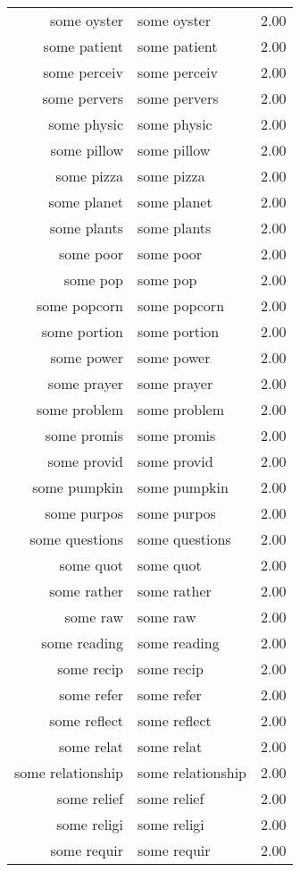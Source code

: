 \begin{table}[ht]
\begin{tabular}{rlr}
  some oyster & some oyster & 2.00 \\ 
  some patient & some patient & 2.00 \\ 
  some perceiv & some perceiv & 2.00 \\ 
  some pervers & some pervers & 2.00 \\ 
  some physic & some physic & 2.00 \\ 
  some pillow & some pillow & 2.00 \\ 
  some pizza & some pizza & 2.00 \\ 
  some planet & some planet & 2.00 \\ 
  some plants & some plants & 2.00 \\ 
  some poor & some poor & 2.00 \\ 
  some pop & some pop & 2.00 \\ 
  some popcorn & some popcorn & 2.00 \\ 
  some portion & some portion & 2.00 \\ 
  some power & some power & 2.00 \\ 
  some prayer & some prayer & 2.00 \\ 
  some problem & some problem & 2.00 \\ 
  some promis & some promis & 2.00 \\ 
  some provid & some provid & 2.00 \\ 
  some pumpkin & some pumpkin & 2.00 \\ 
  some purpos & some purpos & 2.00 \\ 
  some questions & some questions & 2.00 \\ 
  some quot & some quot & 2.00 \\ 
  some rather & some rather & 2.00 \\ 
  some raw & some raw & 2.00 \\ 
  some reading & some reading & 2.00 \\ 
  some recip & some recip & 2.00 \\ 
  some refer & some refer & 2.00 \\ 
  some reflect & some reflect & 2.00 \\ 
  some relat & some relat & 2.00 \\ 
  some relationship & some relationship & 2.00 \\ 
  some relief & some relief & 2.00 \\ 
  some religi & some religi & 2.00 \\ 
  some requir & some requir & 2.00 \\ 

\end{tabular}
\end{table}
